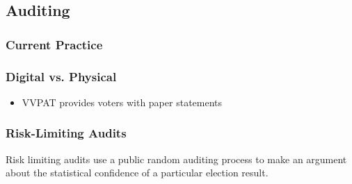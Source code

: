 \subsection{Auditing}
\subsubsection{Current Practice}
\subsubsection{Digital vs. Physical}
\begin{itemize}
\item VVPAT provides voters with paper statements
\end{itemize}
\subsubsection{Risk-Limiting Audits}
Risk limiting audits use a public random auditing process to make an argument about the statistical confidence of a particular election result.
